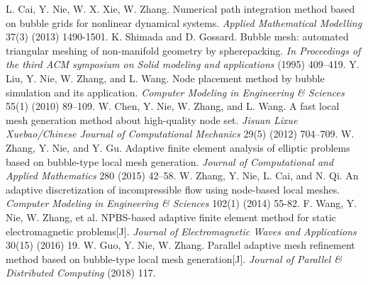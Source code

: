 \documentclass[a4paper, 11pt, final]{article}
\begin{document}
\begin{thebibliography}{aaa}
     L. Cai, Y. Nie, W. X. Xie, W. Zhang. Numerical path integration method based on bubble grids for nonlinear dynamical systems.
    \textsl{Applied Mathematical Modelling} 37(3) (2013) 1490-1501.
     K. Shimada and D. Gossard. Bubble mesh: automated triangular meshing of non-manifold geometry by spherepacking.
    \textsl{In Proceedings of the third ACM symposium on Solid modeling and applications} (1995) 409–419.
     Y. Liu, Y. Nie, W. Zhang, and L. Wang. Node placement method by bubble simulation and its application.
    \textsl{Computer Modeling in Engineering \& Sciences} 55(1) (2010) 89–109.
     W. Chen, Y. Nie, W. Zhang, and L. Wang. A fast local mesh generation method about high-quality node set.
    \textsl{Jisuan Lixue Xuebao/Chinese Journal of Computational Mechanics} 29(5) (2012) 704–709.
     W. Zhang, Y. Nie, and Y. Gu. Adaptive finite element analysis of elliptic problems based on bubble-type local mesh generation.
    \textsl{Journal of Computational and Applied Mathematics} 280 (2015) 42–58.
     W. Zhang, Y. Nie, L. Cai, and N. Qi. An adaptive discretization of incompressible flow using node-based local meshes.
    \textsl{Computer Modeling in Engineering \& Sciences} 102(1) (2014) 55-82.
     F. Wang, Y. Nie, W. Zhang, et al. NPBS-based adaptive finite element method for static electromagnetic problems[J]. 
    \textsl{Journal of Electromagnetic Waves and Applications} 30(15) (2016) 19.
     W. Guo, Y. Nie, W. Zhang. Parallel adaptive mesh refinement method based on bubble-type local mesh generation[J]. 
    \textsl{Journal of Parallel \& Distributed Computing} (2018) 117.

\end{thebibliography}
\end{document}
